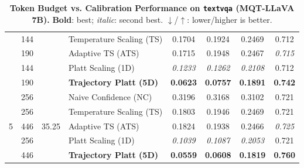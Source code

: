 \begin{table}[t]
\begin{tabular}{ccclcccc}
 & 144 &  & Temperature Scaling (TS) & 0.1704 & 0.1924 & 0.2469 & 0.712 \\
 & 190 &  & Adaptive TS (ATS) & 0.1715 & 0.1948 & 0.2467 & \textit{0.715} \\
 & 144 &  & Platt Scaling (1D) & \textit{0.1233} & \textit{0.1262} & \textit{0.2108} & 0.712 \\
 & 190 &  & \textbf{Trajectory Platt (5D)} & \textbf{0.0623} & \textbf{0.0757} & \textbf{0.1891} & \textbf{0.742} \\
\midrule
\multirow{5}{*}{5} & 256 & \multirow{5}{*}{35.25} & Naive Confidence (NC) & 0.3196 & 0.3168 & 0.3102 & 0.721 \\
 & 256 &  & Temperature Scaling (TS) & 0.1803 & 0.1946 & 0.2469 & 0.721 \\
 & 446 &  & Adaptive TS (ATS) & 0.1824 & 0.1938 & 0.2466 & \textit{0.725} \\
 & 256 &  & Platt Scaling (1D) & \textit{0.1039} & \textit{0.1087} & \textit{0.2053} & 0.721 \\
 & 446 &  & \textbf{Trajectory Platt (5D)} & \textbf{0.0559} & \textbf{0.0608} & \textbf{0.1819} & \textbf{0.760} \\
\bottomrule
\end{tabular}
\caption{\textbf{Token Budget vs. Calibration Performance on \texttt{textvqa} (MQT-LLaVA 7B).} \textbf{Bold}: best; \textit{italic}: second best. $\downarrow$/$\uparrow$: lower/higher is better.}
\label{tab:token_budget_textvqa_mqt}
\end{table}
